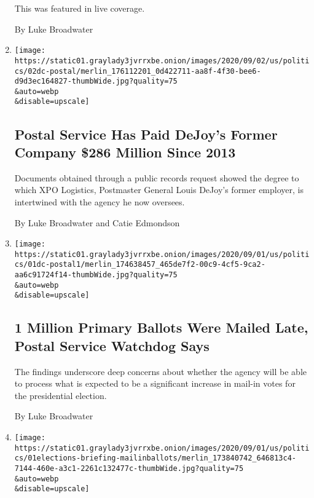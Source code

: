 \begin{enumerate}
  This was featured in live coverage.

  By Luke Broadwater
\item
  \href{/2020/09/02/us/politics/louis-dejoy-usps-paid.html}{}

  \texttt{[image: https://static01.graylady3jvrrxbe.onion/images/2020/09/02/us/politics/02dc-postal/merlin\_176112201\_0d422711-aa8f-4f30-bee6-d9d3ec164827-thumbWide.jpg?quality=75\\\&auto=webp\\\&disable=upscale]}

  \hypertarget{postal-service-has-paid-dejoys-former-company-286-million-since-2013}{%
  \subsection{Postal Service Has Paid DeJoy's Former Company \$286
  Million Since
  2013}\label{postal-service-has-paid-dejoys-former-company-286-million-since-2013}}

  Documents obtained through a public records request showed the degree
  to which XPO Logistics, Postmaster General Louis DeJoy's former
  employer, is intertwined with the agency he now oversees.

  By Luke Broadwater and Catie Edmondson
\item
  \href{/2020/09/01/us/politics/postal-service-late-ballots.html}{}

  \texttt{[image: https://static01.graylady3jvrrxbe.onion/images/2020/09/01/us/politics/01dc-postal1/merlin\_174638457\_465de7f2-00c9-4cf5-9ca2-aa6c91724f14-thumbWide.jpg?quality=75\\\&auto=webp\\\&disable=upscale]}

  \hypertarget{1-million-primary-ballots-were-mailed-late-postal-service-watchdog-says}{%
  \subsection{1 Million Primary Ballots Were Mailed Late, Postal Service
  Watchdog
  Says}\label{1-million-primary-ballots-were-mailed-late-postal-service-watchdog-says}}

  The findings underscore deep concerns about whether the agency will be
  able to process what is expected to be a significant increase in
  mail-in votes for the presidential election.

  By Luke Broadwater
\item
  \href{/live/2020/09/01/us/trump-vs-biden/a-postal-service-watchdog-found-that-more-than-1-million-primary-ballots-were-mailed-late}{}

  \texttt{[image: https://static01.graylady3jvrrxbe.onion/images/2020/09/01/us/politics/01elections-briefing-mailinballots/merlin\_173840742\_646813c4-7144-460e-a3c1-2261c132477c-thumbWide.jpg?quality=75\\\&auto=webp\\\&disable=upscale]}


\end{enumerate}
